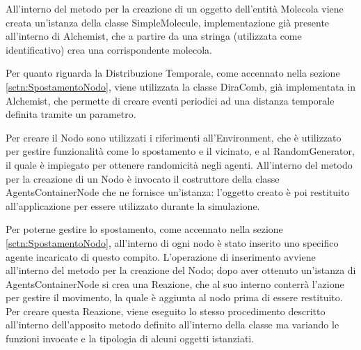 All'interno del metodo per la creazione di un oggetto dell'entità Molecola viene creata un'istanza della classe SimpleMolecule, implementazione già presente all'interno di Alchemist, che a partire da una stringa (utilizzata come identificativo) crea una corrispondente molecola.

Per quanto riguarda la Distribuzione Temporale, come accennato nella sezione \ref{sctn:SpostamentoNodo}, viene utilizzata la classe DiraComb, già implementata in Alchemist, che permette di creare eventi periodici ad una distanza temporale definita tramite un parametro.

Per creare il Nodo sono utilizzati i riferimenti all'Environment, che è utilizzato per gestire funzionalità come lo spostamento e il vicinato, e al RandomGenerator, il quale è impiegato per ottenere randomicità negli agenti. All'interno del metodo per la creazione di un Nodo è invocato il costruttore della classe AgentsContainerNode che ne fornisce un'istanza: l'oggetto creato è poi restituito all'applicazione per essere utilizzato durante la simulazione.

Per poterne gestire lo spostamento, come accennato nella sezione \ref{sctn:SpostamentoNodo}, all'interno di ogni nodo è stato inserito uno specifico agente incaricato di questo compito. L'operazione di inserimento avviene all'interno del metodo per la creazione del Nodo; dopo aver ottenuto un'istanza di AgentsContainerNode si crea una Reazione, che al suo interno conterrà l'azione per gestire il movimento, la quale è aggiunta al nodo prima di essere restituito.
\\
Per creare questa Reazione, viene eseguito lo stesso procedimento descritto all'interno dell'apposito metodo definito all'interno della classe ma variando le funzioni invocate e la tipologia di alcuni oggetti istanziati.

